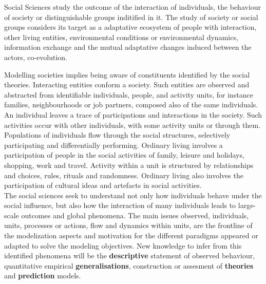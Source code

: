 \documentclass{report}
\begin{document}




Social Sciences study the outcome of the interaction of individuals, the behaviour of society or distinguishable
groups inditified in it. The study of society or social groups considers its target as a adaptative ecosystem of people with interaction, other living entities, environmental conditions or environmental dynamics, information
exchange and the mutual adaptative changes induced between the actors, co-evolution.


Modelling societies implies being aware of constituents identified by the social theories. Interacting entities conform a society. Such entities are observed and abstracted from identifiable individuals, people, and activity units, for instance families, neighbourhoods or job partners, composed also of the same individuals. 
An individual leaves a trace of participations and interactions in the society. Such activities occur with other
individuals, with some activity units or through them. Populations of individuals flow through the social structures, selectively participating and differentially performing. 
Ordinary living involves a participation of people in the social activities of family, leisure and holidays, shopping, work and travel. Activity within a unit is structured by relationships and choices, rules, rituals and randomness. Ordinary living also involves the participation of cultural ideas and artefacts in social activities.\\
The social sciences seek to understand not only how individuals behave under the social influence, but also how the interaction of many individuals leads to large-scale outcomes and global phenomena. 
The main issues observed, individuals, units, processes or actions, flow and dynamics within units, are the frontline of the modelization aspects and motivation for the different paradigms appeared or adapted to solve the modeling objectives. New knowledge to infer from this identified phenomena will be the \textbf{descriptive} statement of observed behaviour, quantitative empirical \textbf{generalisations}, construction or assesment of \textbf{theories} and \textbf{prediction} models.
\end{document}
